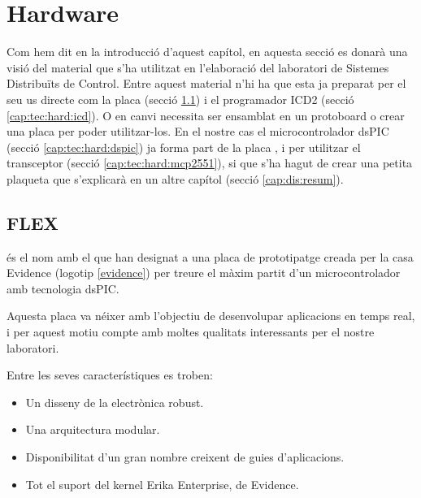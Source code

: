 \section{Hardware}\label{cap:tec:hard}

Com hem dit en la introducció d'aquest capítol, en aquesta secció es donarà una visió del material que s'ha utilitzat en l'elaboració del laboratori de Sistemes Distribuïts de Control. Entre aquest material n'hi ha que esta ja preparat per el seu us directe com la placa \FLEX (secció \ref{cap:tec:hard:flex}) i el programador ICD2 (secció \ref{cap:tec:hard:icd}). O en canvi necessita ser ensamblat en un protoboard o crear una placa per poder utilitzar-los. En el nostre cas el microcontrolador dsPIC (secció \ref{cap:tec:hard:dspic}) ja forma part de la placa \FLEX, i per utilitzar el transceptor (secció \ref{cap:tec:hard:mcp2551}), si que s'ha hagut de crear una petita plaqueta que s'explicarà en un altre capítol (secció \ref{cap:dis:resum}).

\subsection{FLEX}\label{cap:tec:hard:flex}


\FLEX és el nom amb el que han designat a una placa de prototipatge creada per la casa Evidence (logotip \ref{evidence}) per treure el màxim partit d'un microcontrolador amb tecnologia dsPIC.

Aquesta placa va néixer amb l'objectiu de desenvolupar aplicacions en temps real, i per aquest motiu compte amb moltes qualitats interessants per el nostre laboratori.

Entre les seves característiques es troben:

\begin{itemize}
	\item Un disseny de la electrònica robust.
	\item Una arquitectura modular.
	\item Disponibilitat d'un gran nombre creixent de guies d'aplicacions.
	\item Tot el suport del kernel Erika Enterprise, de Evidence.
\end{itemize}


